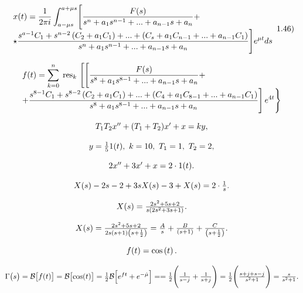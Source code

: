 \documentclass{article}
\begin{document}
\[
$$
\begin{array} {l} {x ( t )=\displaystyle\frac{1} {2 \pi i} \displaystyle\int_{a-\mu s}^{a+\mu s} \Biggl[ \displaystyle\frac{F ( s )} {s^{n}+a_{1} s^{n-1}+...+a_{n-1} s+a_{n}}+} \\ {\star\displaystyle\frac{s^{a-1} C_{1}+s^{n-2} \left( C_{2}+a_{1} C_{1} \right)+...+( C_{s}+a_{1} C_{n-1}+...+a_{n-1} C_{1} )} {s^{n}+a_{1} s^{n-1}+...+a_{n-1} s+a_{n}} \Biggr] e^{\mu t} d s} \\ \end{array}
$$
1.46)
\]

\[
$$
\begin{array} {l} {{f ( t )=\displaystyle\sum_{k=0}^{n} \mathrm{\scriptsize~ r e s}_{k} ~ \Bigg[ \Bigg[ \frac{F ( s )} {s^{8}+a_{1} s^{8-1}+...+a_{n-1} s+a_{n}}+}} \\ {{\displaystyle+\frac{s^{8-1} C_{1}+s^{8-2} \left( C_{2}+a_{1} C_{1} \right)+...+\left( C_{4}+a_{1} C_{8-1}+...+a_{n-1} C_{1} \right)} {s^{8}+a_{1} s^{8-1}+...+a_{n-1} s+a_{n}} \Bigg] \, e^{4 t} \Bigg\}}} \end{array}
$$
\]

\[
$$
T_{1} T_{2} x^{\prime\prime}+( T_{1}+T_{2} ) x^{\prime}+x=k y,
$$
\]

\[
$$
y={\frac{1} {5}} 1 ( t ), \ k=1 0, \ T_{1}=1, \ T_{2}=2,
$$
\]

\[
$$
2 x^{\prime\prime}+3 x^{\prime}+x=2 \cdot1 ( t ).
$$
\]

\[
$$
X ( s )-2 s-2+3 s X ( s )-3+X ( s )=2 \cdot\frac{1} {s}.
$$
\]

\[
$$
X ( s )=\frac{2 s^{2}+5 s+2} {s ( 2 s^{2}+3 s+1 )}.
$$
\]

\[
$$
X ( s )=\frac{2 s^{2}+5 s+2} {2 s ( s+1 ) \left( s+\frac{1} {2} \right)}=\frac{A} {s}+\frac{B} {( s+1 )}+\frac{C} {\left( s+\frac{1} {2} \right)}.
$$
\]

\[
$$
f ( t )=\cos\left( t \right).
$$
\]

\[
$$
\Gamma\bigl( s \bigr)=\mathcal{B} \bigl[ f ( t ) \bigr]=\mathcal{B} \bigl[ \cos( t ) \bigr]=\frac{1} {2} \mathcal{B} \Bigl[ e^{f t}+e^{-\dot{\mu}} \Bigr]=
$$
$$
= \frac{1} {2} \Biggl( \frac{1} {s-j}+\frac{1} {s+j} \Biggr)=\frac{1} {2} \Biggl( \frac{s+j+s-j} {s^{2}+1} \Biggr)=\frac{s} {s^{2}+1}.
$$
\]
\end{document}
